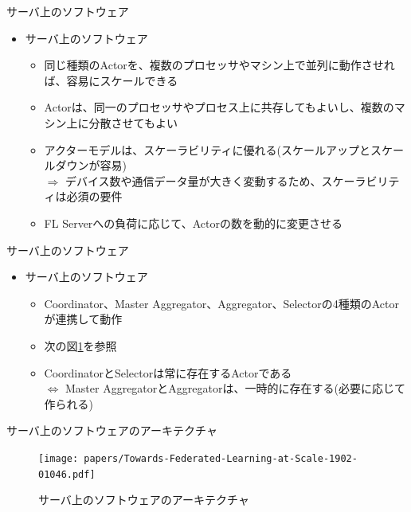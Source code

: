 \documentclass[dvipdfmx,notheorems,t]{beamer}
\begin{document}
\begin{frame}{サーバ上のソフトウェア}

\begin{itemize}
	\item サーバ上のソフトウェア
	\begin{itemize}		
		\item 同じ種類のActorを、複数のプロセッサやマシン上で並列に動作させれば、容易にスケールできる
		\item Actorは、同一のプロセッサやプロセス上に共存してもよいし、複数のマシン上に分散させてもよい
		\newline
		
		\item アクターモデルは、\alert{スケーラビリティ}に優れる(スケールアップとスケールダウンが容易) \\
		$\Rightarrow$ デバイス数や通信データ量が大きく変動するため、スケーラビリティは必須の要件
		\newline
		
		\item FL Serverへの負荷に応じて、Actorの数を動的に変更させる
	\end{itemize}
\end{itemize}

\end{frame}

\begin{frame}{サーバ上のソフトウェア}

\begin{itemize}
	\item サーバ上のソフトウェア
	\begin{itemize}
		\item \alert{Coordinator}、\alert{Master Aggregator}、\alert{Aggregator}、\alert{Selector}の4種類のActorが連携して動作
		\item 次の図\ref{fig:fl-server-arch}を参照
		\newline
		
		\item CoordinatorとSelectorは常に存在するActorである \\
		$\Leftrightarrow$ Master AggregatorとAggregatorは、一時的に存在する(必要に応じて作られる)
	\end{itemize}
\end{itemize}

\end{frame}

\begin{frame}{サーバ上のソフトウェアのアーキテクチャ}

\begin{figure}
	\centering
	\texttt{[image: papers/Towards-Federated-Learning-at-Scale-1902-01046.pdf]}
	\caption{サーバ上のソフトウェアのアーキテクチャ~\cite{1902.01046}}
	\label{fig:fl-server-arch}
\end{figure}

\end{frame}
\end{document}
